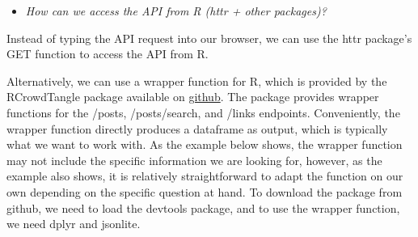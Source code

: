 \documentclass[
]{book}
\newenvironment{Shaded}{\begin{snugshade}}{\end{snugshade}}
\newcommand{\AttributeTok}[1]{\textcolor[rgb]{0.77,0.63,0.00}{#1}}
\newcommand{\CommentTok}[1]{\textcolor[rgb]{0.56,0.35,0.01}{\textit{#1}}}
\newcommand{\DecValTok}[1]{\textcolor[rgb]{0.00,0.00,0.81}{#1}}
\newcommand{\FunctionTok}[1]{\textcolor[rgb]{0.00,0.00,0.00}{#1}}
\newcommand{\NormalTok}[1]{#1}
\newcommand{\OtherTok}[1]{\textcolor[rgb]{0.56,0.35,0.01}{#1}}
\newcommand{\SpecialCharTok}[1]{\textcolor[rgb]{0.00,0.00,0.00}{#1}}
\newcommand{\StringTok}[1]{\textcolor[rgb]{0.31,0.60,0.02}{#1}}
\providecommand{\tightlist}{%
  \setlength{\itemsep}{0pt}\setlength{\parskip}{0pt}}
\begin{document}
\begin{itemize}
\tightlist
\item
  \emph{How can we access the API from R (httr + other packages)?}
\end{itemize}

Instead of typing the API request into our browser, we can use the httr package's GET function to access the API from R.

\begin{Shaded}
\end{Shaded}

Alternatively, we can use a wrapper function for R, which is provided by the RCrowdTangle package available on \href{\%22https://github.com/cbpuschmann/RCrowdTangle\%22}{github}. The package provides wrapper functions for the /posts, /posts/search, and /links endpoints. Conveniently, the wrapper function directly produces a dataframe as output, which is typically what we want to work with. As the example below shows, the wrapper function may not include the specific information we are looking for, however, as the example also shows, it is relatively straightforward to adapt the function on our own depending on the specific question at hand.
To download the package from github, we need to load the devtools package, and to use the wrapper function, we need dplyr and jsonlite.
\end{document}
